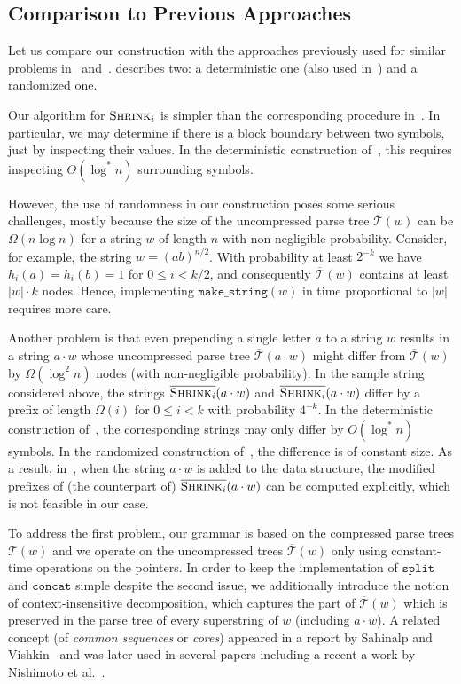 \documentclass[a4paper]{article}
\theoremstyle{remark}
\newcommand{\makeop}{\mathtt{make\_string}}
\newcommand{\concop}{\mathtt{concat}}
\newcommand{\splitop}{\mathtt{split}}
\newcommand{\shrink}[1]{\ensuremath{\textsc{Shrink}_{#1}}}
\newcommand{\cshrink}[1]{\ensuremath{\overline{\textsc{Shrink}_{#1}}}}
\newcommand{\str}{w}
\newcommand{\stree}{\mathcal{T}}
\newcommand{\ustree}{\mathcal{\overline{T}}}
\begin{document}
\subsection{Comparison to Previous Approaches}\label{sec:comp}

Let us compare our construction with the approaches previously used for similar problems in~\cite{Mehlhorn} and~\cite{Alstrup}.
\cite{Mehlhorn} describes two: a deterministic one (also used in~\cite{Alstrup}) and a randomized one.

Our algorithm for $\shrink{i}$ is simpler than the corresponding procedure in~\cite{Mehlhorn}.
In particular, we may determine if there is a block boundary between two symbols, just by inspecting their values.
In the deterministic construction of~\cite{Mehlhorn}, this requires inspecting $\Theta(\log^{*} n)$ surrounding symbols.

However, the use of randomness in our construction poses some serious challenges,
mostly because the size of the uncompressed parse tree $\ustree(\str)$ can be $\Omega(n\log n)$ for a string $\str$ of length $n$ with non-negligible probability.
Consider, for example, the string $\str=(ab)^{n/2}$. With probability at least $2^{-k}$ we have $h_i(a)=h_i(b)=1$
for $0 \le i < k/2$, and consequently $\ustree(\str)$ contains at least $|\str|\cdot k$ nodes. Hence, implementing $\makeop(\str)$
in time proportional to $|\str|$ requires more care.

Another problem is that even prepending a single letter $a$ to a string $\str$ results in a string $a\cdot \str$ 
whose uncompressed parse tree $\ustree(a\cdot w)$ might differ from $\ustree(w)$ by $\Omega(\log^2n)$ nodes (with non-negligible probability).
In the sample string considered above, the strings $\cshrink{i}(a \cdot \str)$ and $\cshrink{i}(a \cdot \str)$
differ by a prefix of length $\Omega(i)$ for $0\le i < k$ with probability $4^{-k}$.
In the deterministic construction of~\cite{Mehlhorn}, the corresponding strings may only differ by $O(\log^{*} n)$ symbols.
In the randomized construction of~\cite{Mehlhorn}, the difference is of constant size.
As a result, in~\cite{Mehlhorn,Alstrup}, when the string $a \cdot \str$ is added to the data structure, the modified prefixes of (the counterpart of) $\cshrink{i}(a \cdot \str)$ can be computed explicitly, which is not feasible in our case. 

To address the first problem, our grammar is based on the compressed parse trees $\stree(\str)$ and we operate on the uncompressed trees $\ustree(\str)$
only using constant-time operations on the pointers. 
In order to keep the implementation of $\splitop$ and $\concop$ simple despite the second issue,
we additionally introduce the notion of context-insensitive decomposition, which captures the part of $\ustree(\str)$ which is preserved in the parse tree of every superstring of $\str$ (including $a \cdot \str$).
A related concept (of \emph{common sequences} or \emph{cores}) appeared in a report by Sahinalp and Vishkin~\cite{SV1995} and was later used in several
papers including a recent a work by Nishimoto et al.~\cite{DBLP:journals/corr/NishimotoIIBT15}.
\end{document}
